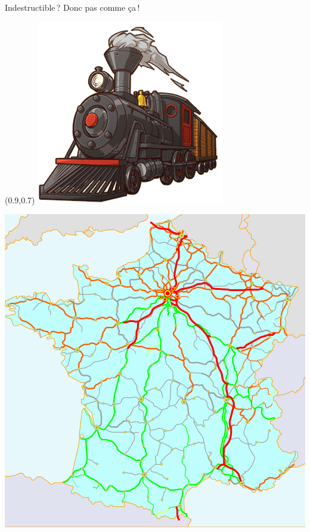 \begin{frame}{Indestructible ? Donc pas comme ça !}
  \begin{textblock*}{0.25\textwidth}(0.9\textwidth,0.7\textheight)
    \includegraphics[width=\textwidth]{concepts/trainwestern.png}
  \end{textblock*}
  \centering
  \includegraphics[height=0.8\textheight]{concepts/france.png}
\end{frame}

